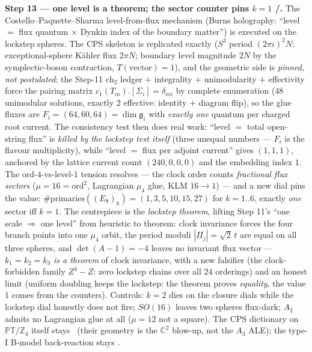 \documentclass[11pt,a4paper]{article}
\newcommand{\Z}{\mathbb{Z}}
\theoremstyle{definition}
\begin{document}
\par\smallskip\noindent\textbf{Step 13 --- one level is a theorem; the sector counter pins $k=1$
\mE/\mC.} The Costello--Paquette--Sharma level-from-flux mechanism (Burns holography: ``level $=$
flux quantum $\times$ Dynkin index of the boundary matter'') is executed on the lockstep spheres.
The CPS skeleton is replicated exactly ($S^3$ period $(2\pi i)^2N$; exceptional-sphere K\"ahler
flux $2\pi N$; boundary level magnitude $2N$ by the symplectic-boson contraction, $T(\text{vector})=1$),
and the geometric side is \emph{pinned, not postulated}: the Step-11 $\mathrm{ch}_2$ ledger $+$
integrality $+$ unimodularity $+$ effectivity force the pairing matrix
$c_1(T_m).[\Sigma_i]=\delta_{mi}$ by complete enumeration ($48$ unimodular solutions, exactly $2$
effective: identity $+$ diagram flip), so the glue fluxes are $F_i=(64,60,64)=\dim\mathfrak g_i$
with \emph{exactly one} quantum per charged root current. The consistency test then does real
work: ``level $=$ total open-string flux'' is \emph{killed by the lockstep test itself} (three
unequal numbers --- $F_i$ is the flavour multiplicity), while ``level $=$ flux per adjoint
current'' gives $(1,1,1)$, anchored by the lattice current count $(240,0,0,0)$ and the embedding
index $1$. The ord-$4$-vs-level-$1$ tension resolves --- the clock order counts \emph{fractional
flux sectors} ($\mu=16=\mathrm{ord}^2$, Lagrangian $\mu_4$ glue, KLM $16\to1$) --- and a new dial
pins the value: $\#\mathrm{primaries}((E_8)_k)=(1,3,5,10,15,27)$ for $k=1..6$, exactly \emph{one}
sector iff $k=1$. The centrepiece is the \emph{lockstep theorem}, lifting Step 11's ``one scale
$\Rightarrow$ one level'' from heuristic to theorem: clock invariance forces the four branch
points into one $\mu_4$ orbit, the period moduli $|\Pi_j|=\sqrt2\,t$ are equal on all three
spheres, and $\det(A-1)=-4$ leaves no invariant flux vector --- $k_1=k_2=k_3$ \emph{is a theorem}
of clock invariance, with a new falsifier (the clock-forbidden family $Z^4{-}Z$: zero lockstep
chains over all $24$ orderings) and an honest limit (uniform doubling keeps the lockstep: the
theorem proves \emph{equality}, the value $1$ comes from the counters). Controls: $k=2$ dies on
the closure dials while the lockstep dial honestly does not fire; $SO(16)$ leaves two spheres
flux-dark; $A_2$ admits no Lagrangian glue at all ($\mu=12$ not a square). The CPS dictionary on
$\mathbb{PT}/\Z_4$ itself stays \mC\ (their geometry is the $\mathbb C^2$ blow-up, not the $A_3$
ALE); the type-I B-model back-reaction stays \mO.
\end{document}
